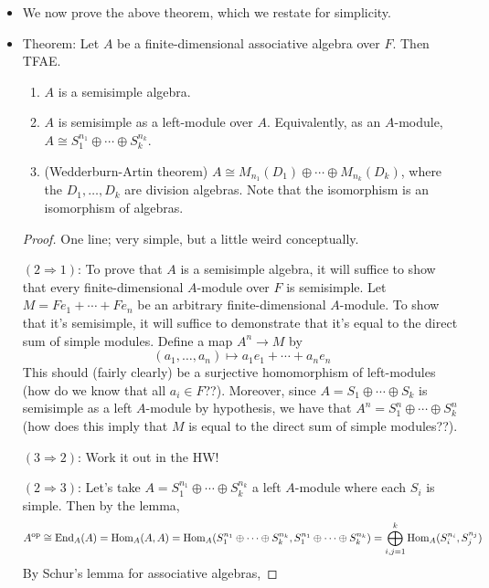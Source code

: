 \documentclass[../notes.tex]{subfiles}
\begin{document}
\begin{itemize}
    \item We now prove the above theorem, which we restate for simplicity.
    \item Theorem: Let $A$ be a finite-dimensional associative algebra over $F$. Then TFAE.
    \begin{enumerate}
        \item $A$ is a semisimple algebra.
        \item $A$ is semisimple as a left-module over $A$. Equivalently, as an $A$-module, $A\cong S_1^{n_1}\oplus\cdots\oplus S_k^{n_k}$.
        \item (Wedderburn-Artin theorem) $A\cong M_{n_1}(D_1)\oplus\cdots\oplus M_{n_k}(D_k)$, where the $D_1,\dots,D_k$ are division algebras. Note that the isomorphism is an isomorphism of algebras.
    \end{enumerate}
    \begin{proof}
        One line; very simple, but a little weird conceptually.\par
        $(2\Rightarrow 1)$: To prove that $A$ is a semisimple algebra, it will suffice to show that every finite-dimensional $A$-module over $F$ is semisimple. Let $M=Fe_1+\cdots+Fe_n$ be an arbitrary finite-dimensional $A$-module. To show that it's semisimple, it will suffice to demonstrate that it's equal to the direct sum of simple modules. Define a map $A^n\to M$ by
        \begin{equation*}
            (a_1,\dots,a_n) \mapsto a_1e_1+\cdots+a_ne_n
        \end{equation*}
        This should (fairly clearly) be a surjective homomorphism of left-modules (how do we know that all $a_i\in F$??). Moreover, since $A=S_1\oplus\cdots\oplus S_k$ is semisimple as a left $A$-module by hypothesis, we have that $A^n=S_1^n\oplus\cdots\oplus S_k^n$ (how does this imply that $M$ is equal to the direct sum of simple modules??).\par
        $(3\Rightarrow 2)$: Work it out in the HW!\par
        $(2\Rightarrow 3)$: Let's take $A=S_1^{n_1}\oplus\cdots\oplus S_k^{n_k}$ a left $A$-module where each $S_i$ is simple. Then by the lemma,
        \begin{equation*}
            A^\text{op} \cong \operatorname{End}_A(A)
            = \operatorname{Hom}_A(A,A)
            = \operatorname{Hom}_A(S_1^{n_1}\oplus\cdots\oplus S_k^{n_k},S_1^{n_1}\oplus\cdots\oplus S_k^{n_k})
            = \bigoplus_{i,j=1}^k\operatorname{Hom}_A(S_i^{n_i},S_j^{n_j})
        \end{equation*}
        By Schur's lemma for associative algebras,

\end{proof}
\end{itemize}
\end{document}
